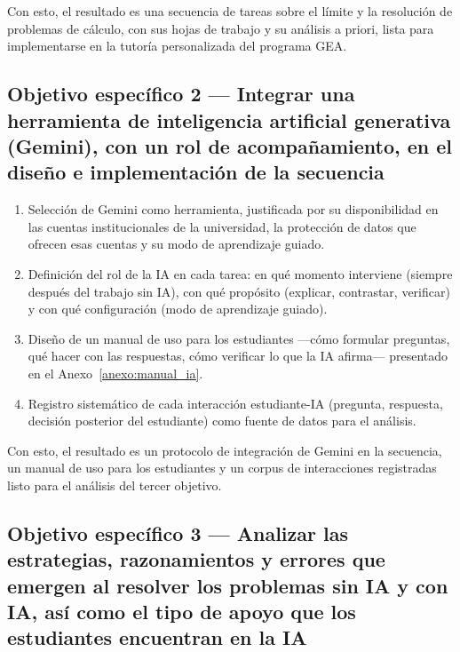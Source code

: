 Con esto, el resultado es una secuencia de tareas sobre el límite y la resolución de problemas de cálculo, con sus hojas de trabajo y su análisis a priori, lista para implementarse en la tutoría personalizada del programa GEA.

\subsection*{Objetivo específico 2 --- Integrar una herramienta de inteligencia artificial generativa (Gemini), con un rol de acompañamiento, en el diseño e implementación de la secuencia}

\begin{enumerate}
  \item Selección de Gemini como herramienta, justificada por su disponibilidad en las cuentas institucionales de la universidad, la protección de datos que ofrecen esas cuentas y su modo de aprendizaje guiado.
  \item Definición del rol de la IA en cada tarea: en qué momento interviene (siempre después del trabajo sin IA), con qué propósito (explicar, contrastar, verificar) y con qué configuración (modo de aprendizaje guiado).
  \item Diseño de un manual de uso para los estudiantes ---cómo formular preguntas, qué hacer con las respuestas, cómo verificar lo que la IA afirma--- presentado en el Anexo~\ref{anexo:manual_ia}.
  \item Registro sistemático de cada interacción estudiante-IA (pregunta, respuesta, decisión posterior del estudiante) como fuente de datos para el análisis.
\end{enumerate}

Con esto, el resultado es un protocolo de integración de Gemini en la secuencia, un manual de uso para los estudiantes y un corpus de interacciones registradas listo para el análisis del tercer objetivo.

\subsection*{Objetivo específico 3 --- Analizar las estrategias, razonamientos y errores que emergen al resolver los problemas sin IA y con IA, así como el tipo de apoyo que los estudiantes encuentran en la IA}

